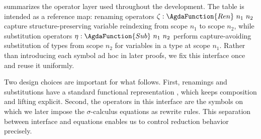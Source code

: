 \documentclass[manuscript,screen,review,anonymous,acmsmall]{acmart}
\begin{document}


 summarizes the operator layer used throughout the development.
The table is intended as a reference map: renaming operators $\zeta :
\AgdaFunction{Ren}~n_1~n_2$ capture structure-preserving variable 
reindexing from scope $n_1$ to scope $n_2$, while substitution operators $\eta :
\AgdaFunction{Sub}~n_1~n_2$ perform capture-avoiding substitution of types from scope $n_2$
for variables in a type at scope $n_1$.
Rather than introducing each symbol ad hoc in later proofs, we fix this interface once and
reuse it uniformly. 

Two design choices are important for what follows.  First, renamings
and substitutions have a standard functional representation \cite{ren-sub,DBLP:journals/jar/BentonHKM12,DBLP:journals/scp/KokkeSW20}, which keeps composition and lifting explicit.  Second, the
operators in this interface are the symbols on which we later impose the $\sigma$-calculus
equations as rewrite rules.  This separation between interface and equations enables
us to control reduction behavior precisely.
\end{document}

